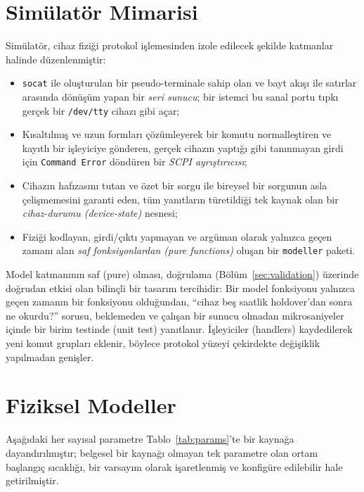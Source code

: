 \documentclass[9pt,twocolumn,a4paper]{extarticle}
\begin{document}
\section{Simülatör Mimarisi}
\label{sec:arch}
Simülatör, cihaz fiziği protokol işlemesinden izole edilecek şekilde katmanlar halinde düzenlenmiştir:
\begin{itemize}
\item \texttt{socat} ile oluşturulan bir pseudo-terminale sahip olan ve bayt akışı ile satırlar arasında dönüşüm yapan bir \emph{seri sunucu}; bir istemci bu sanal portu tıpkı gerçek bir \texttt{/dev/tty} cihazı gibi açar;
\item Kısaltılmış ve uzun formları çözümleyerek bir komutu normalleştiren ve kayıtlı bir işleyiciye gönderen, gerçek cihazın yaptığı gibi tanınmayan girdi için \texttt{Command Error} döndüren bir \emph{SCPI ayrıştırıcısı};
\item Cihazın hafızasını tutan ve özet bir sorgu ile bireysel bir sorgunun asla çelişmemesini garanti eden, tüm yanıtların türetildiği tek kaynak olan bir \emph{cihaz-durumu (device-state)} nesnesi;
\item Fiziği kodlayan, girdi/çıktı yapmayan ve argüman olarak yalnızca geçen zamanı alan \emph{saf fonksiyonlardan (pure functions)} oluşan bir \texttt{modeller} paketi.
\end{itemize}
Model katmanının saf (pure) olması, doğrulama (Bölüm~\ref{sec:validation}) üzerinde doğrudan etkisi olan bilinçli bir tasarım tercihidir: Bir model fonksiyonu yalnızca geçen zamanın bir fonksiyonu olduğundan, ``cihaz beş saatlik holdover'dan sonra ne okurdu?'' sorusu, beklemeden ve çalışan bir sunucu olmadan mikrosaniyeler içinde bir birim testinde (unit test) yanıtlanır. İşleyiciler (handlers) kaydedilerek yeni komut grupları eklenir, böylece protokol yüzeyi çekirdekte değişiklik yapılmadan genişler.

\section{Fiziksel Modeller}
\label{sec:models}
Aşağıdaki her sayısal parametre Tablo~\ref{tab:params}'te bir kaynağa dayandırılmıştır; belgesel bir kaynağı olmayan tek parametre olan ortam başlangıç sıcaklığı, bir varsayım olarak işaretlenmiş ve konfigüre edilebilir hale getirilmiştir.
\end{document}
